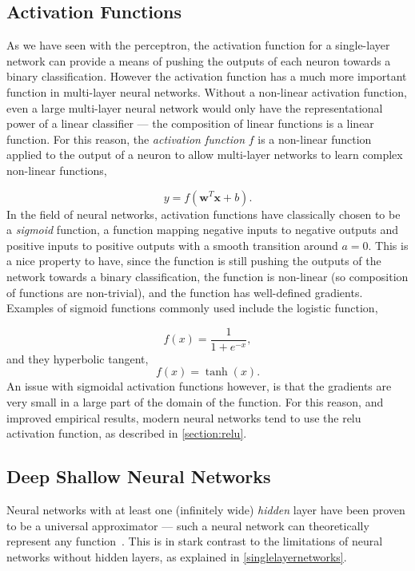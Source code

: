 \documentclass[thesis]{subfiles}
\begin{document}
\subsection{Activation Functions}\label{activationfunctions}
As we have seen with the perceptron, the activation function for a single-layer network can provide a means of pushing the outputs of each neuron towards a binary classification. However the activation function has a much more important function in multi-layer neural networks. Without a non-linear activation function, even a large multi-layer neural network would only have the representational power of a linear classifier --- the composition of linear functions is a linear function. For this reason, the \emph{activation function} $f$ is a non-linear function applied to the output of a neuron to allow multi-layer networks to learn complex non-linear functions,

\begin{equation}
y = f\left(\mathbf{w}^T\mathbf{x} + b\right).
\end{equation}
%
In the field of neural networks, activation functions have classically chosen to be a \emph{sigmoid} function, \ie a function mapping negative inputs to negative outputs and positive inputs to positive outputs with a smooth transition around $a = 0$. This is a nice property to have, since the function is still pushing the outputs of the network towards a binary classification, the function is non-linear (so composition of functions are non-trivial), and the function has well-defined gradients. Examples of sigmoid functions commonly used include the logistic function, 

\begin{equation}
	f(x) = \frac{1}{1+e^{-x}},
\end{equation}
%
and they hyperbolic tangent,
\begin{equation}
	f(x) = \tanh(x).
\end{equation}
%
An issue with sigmoidal activation functions however, is that the gradients are very small in a large part of the domain of the function. For this reason, and improved empirical results, modern neural networks tend to use the \gls{relu} activation function, as described in \cref{section:relu}.


\subsection{Deep \Vs Shallow Neural Networks}
Neural networks with at least one (infinitely wide) \emph{hidden} layer have been proven to be a universal approximator --- \ie such a neural network can theoretically represent any function~\citep{journals/mcss/Cybenko92,hornik89a}. This is in stark contrast to the limitations of neural networks without hidden layers, as explained in \cref{singlelayernetworks}.
\end{document}
